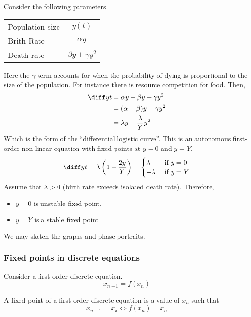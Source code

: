 \documentclass{article}
\begin{document}
\begin{eg}
    Consider the following parameters
    \begin{center}
        \begin{tabular}{lc}
            Population size & $y(t)$ \\
            Brith Rate & $\alpha y$ \\
            Death rate & $\beta y + \gamma y^2$
        \end{tabular}
    \end{center}

    Here the $\gamma$ term accounts for when the probability of dying is proportional to the size of the population.
    For instance there is resource competition for food.
    Then,
    \begin{align*}
        \diff yt &= \alpha y - \beta y - \gamma y^2 \\
        &= (\alpha - \beta)y - \gamma y^2 \\
        &= \lambda y - \frac{\lambda}{Y} y^2
    \end{align*}
    Which is the form of the ``differential logistic curve''.
    This is an autonomous first-order non-linear equation with fixed points at $y=0$ and $y=Y$.
    \[
        \diff yt =  \lambda \bkt{1- \frac{2y}{Y}} = \begin{cases}
            \lambda & \text{ if } y = 0 \\
            -\lambda & \text{ if } y = Y
        \end{cases}
    \]
    Assume that $\lambda > 0$ (birth rate exceeds isolated death rate). Therefore,
    \begin{itemize}
        \item $y = 0$ is unstable fixed point,
        \item $y = Y$ is a stable fixed point
    \end{itemize}
    We may sketch the graphs and phase portraits.
\end{eg}

\subsubsection{Fixed points in discrete equations}
Consider a first-order discrete equation.
\[
    x_{n+1} = f( x_n )
\]

\begin{defi}
    A fixed point of a first-order discrete equation is a value of $x_n$ such that
    \[
        x_{n+1} = x_{n} \Leftrightarrow f(x_n) = x_n
    \]
\end{defi}
\end{document}
